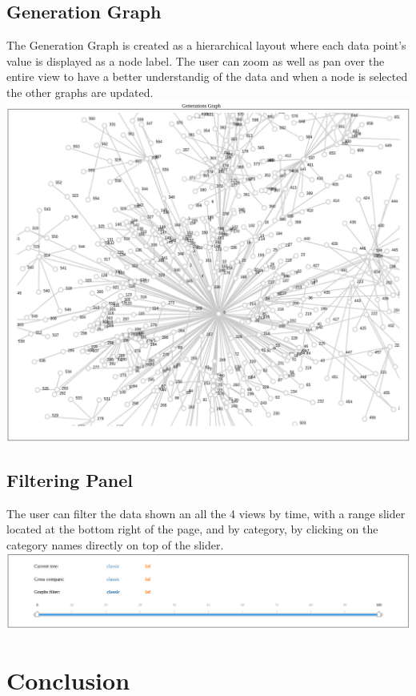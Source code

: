 \documentclass[conference,compsoc]{IEEEtran}
\begin{document}
\subsection{Generation Graph}
The Generation Graph is created as a hierarchical layout where each data point's value is displayed as a node label. The user can zoom as well as pan over the entire view to have a better understandig of the data and when a node is selected the other graphs are updated.
\includegraphics[scale=0.2]{img/tree}

\subsection{Filtering Panel}
The user can filter the data shown an all the 4 views by time, with a range slider located at the bottom right of the page, and by category, by clicking on the category names directly on top of the slider.
\includegraphics[scale=0.3]{img/panel}
\section{Conclusion}






\end{document}

